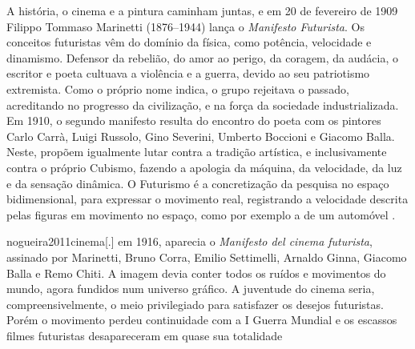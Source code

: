 A história, o cinema e a pintura caminham juntas, e em 20 de fevereiro
de 1909 Filippo Tommaso Marinetti (1876--1944) lança o \emph{Manifesto
	Futurista}. Os conceitos futuristas vêm do domínio da física, como
potência, velocidade e dinamismo. Defensor da rebelião, do amor ao
perigo, da coragem, da audácia, o escritor e poeta cultuava a violência
e a guerra, devido ao seu patriotismo extremista. Como o próprio nome
indica, o grupo rejeitava o passado, acreditando no progresso da
civilização, e na força da sociedade industrializada. Em 1910, o
segundo manifesto resulta do encontro do poeta com os pintores Carlo
Carrà, Luigi Russolo, Gino Severini, Umberto Boccioni e Giacomo Balla.
Neste, propõem igualmente lutar contra a tradição artística, e
inclusivamente contra o próprio Cubismo, fazendo a apologia da máquina,
da velocidade, da luz e da sensação dinâmica. O Futurismo é a
concretização da pesquisa no espaço bidimensional, para expressar o
movimento real, registrando a velocidade descrita pelas figuras em
movimento no espaço, como por exemplo a de um automóvel \parencite{imbriosi2022}.

\begin{displaycquote}[144]{nogueira2011cinema}[.]
	\textelp{} em 1916, aparecia o \emph{Manifesto del cinema futurista},
	assinado por Marinetti, Bruno Corra, Emilio Settimelli, Arnaldo Ginna,
	Giacomo Balla e Remo Chiti. A imagem devia conter todos os ruídos e
	movimentos do mundo, agora fundidos num universo gráfico. A juventude do
	cinema seria, compreensivelmente, o meio privilegiado para satisfazer os
	desejos futuristas. Porém o movimento perdeu continuidade com a I Guerra
	Mundial e os escassos filmes futuristas desapareceram em quase sua
	totalidade
\end{displaycquote}

